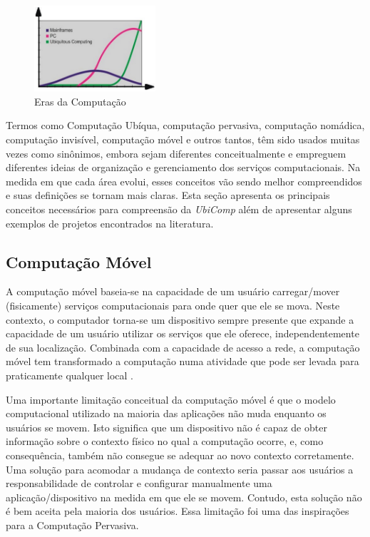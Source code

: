 \begin{figure}[ht]
\centering
    \includegraphics[width=0.4\textwidth,natwidth=610,natheight=642]{images/era.png}
    \caption{Eras da Computação}
    \label{fig:era}
\end{figure}

Termos como Computação Ubíqua, computação pervasiva, computação nomádica, computação invisível, computação móvel e outros tantos, têm sido usados muitas vezes como sinônimos, embora sejam diferentes conceitualmente e empreguem diferentes ideias de organização e gerenciamento dos serviços computacionais. Na medida em que cada área evolui, esses conceitos vão sendo melhor compreendidos e suas definições se tornam mais claras. Esta seção apresenta os principais conceitos necessários para compreensão da \textit{UbiComp} além de apresentar alguns exemplos de projetos encontrados na literatura. 


\subsection{Computação Móvel}\label{sec:comp-movel}
A computação móvel baseia-se na capacidade de um usuário carregar/mover (fisicamente) serviços computacionais para onde quer que ele se mova. Neste contexto, o computador torna-se um dispositivo sempre presente que expande a capacidade de um usuário utilizar os serviços que ele oferece, independentemente de sua localização. Combinada com a capacidade de acesso a rede, a computação móvel tem transformado a computação numa atividade que pode ser levada para praticamente qualquer local \cite{netodesenvolvimento}.
					
Uma importante limitação conceitual da computação móvel é que o modelo computacional utilizado na maioria das aplicações não muda enquanto os usuários se movem. Isto significa que um dispositivo não é capaz de obter informação sobre o contexto físico no qual a computação ocorre, e, como consequência, também não consegue se adequar ao novo contexto corretamente. Uma solução para acomodar a mudança de contexto seria passar aos usuários a responsabilidade de controlar e configurar manualmente uma aplicação/dispositivo na medida em que ele se movem. Contudo, esta solução não é bem aceita pela maioria dos usuários. Essa limitação foi uma das inspirações para a Computação Pervasiva. 

